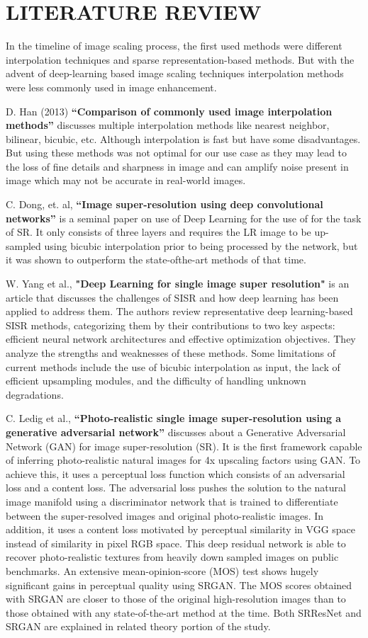 \newpage
\section{LITERATURE REVIEW}
In the timeline of image scaling process, the first used methods were different interpolation techniques and sparse representation-based methods. But with the advent
of deep-learning based image scaling techniques interpolation methods were less commonly used in image enhancement.

D. Han (2013) {\bf“Comparison of commonly used image interpolation methods”} discusses multiple interpolation methods like nearest neighbor, bilinear, bicubic, etc. Although interpolation is fast but have some disadvantages. But using these methods was not optimal for our use case as they may lead to the loss of fine details and sharpness in image and can amplify noise present in image which may not be accurate in real-world images.\cite{r1}

C. Dong, et. al, {\bf“Image super-resolution using deep convolutional networks”} is a seminal paper on use of Deep Learning for the use of for the task of SR. It only consists of three layers and requires the LR image to be up-sampled using bicubic interpolation prior to being processed by the network, but it was shown to outperform the state-ofthe-art methods of that time.\cite{r2}

W. Yang et al., {\bf "Deep Learning for single image super resolution"} is an article that discusses the challenges of SISR and how deep learning has been applied to address them. The authors review representative deep learning-based SISR methods, categorizing them by their contributions to two key aspects: efficient neural network architectures and effective optimization objectives. They analyze the strengths and weaknesses of these methods. Some limitations of current methods include the use of bicubic interpolation as input, the lack of efficient upsampling modules, and the difficulty of handling unknown degradations. \cite{r4}

C. Ledig et al., {\bf“Photo-realistic single image super-resolution using a generative adversarial network”} discusses about a Generative Adversarial Network (GAN) for image super-resolution (SR). It is the first framework capable of inferring photo-realistic natural images for 4x upscaling factors using GAN. To achieve this, it uses
a perceptual loss function which consists of an adversarial loss and a content loss. The adversarial loss pushes the solution to the natural image manifold using a discriminator
network that is trained to differentiate between the super-resolved images and original photo-realistic images. In addition, it uses a content loss motivated by perceptual
similarity in VGG space instead of similarity in pixel RGB space. This deep residual network is able to recover photo-realistic textures from heavily down sampled images on public
benchmarks. An extensive mean-opinion-score (MOS) test shows hugely significant gains in perceptual quality using SRGAN. The MOS scores obtained with SRGAN are
closer to those of the original high-resolution images than to those obtained with any state-of-the-art method at the time. Both SRResNet and SRGAN are explained in related theory portion of the study.\cite{r3}
